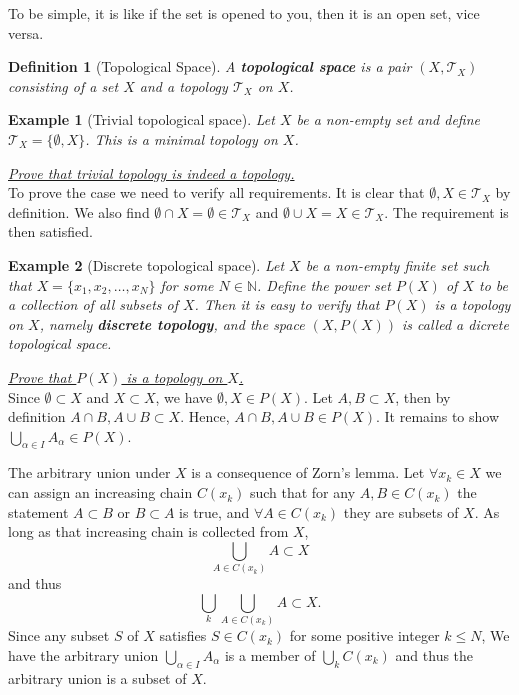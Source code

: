 \documentclass[12pt]{article}
\newtheorem{definition}{Definition}[section]
\newtheorem*{example}{Example}
\renewenvironment{proof}[1][Proof]{\begin{snugshade*} \underline{\textit{{#1}.}}\\}{\hfill \qedsymbol \end{snugshade*}}
\begin{document}
    To be simple, it is like if the set is opened to you, then it is an open set, vice versa.

    \begin{definition}[Topological Space]
        A \textbf{topological space} is a pair $(X,\mathcal{T}_X)$ consisting of a set $X$ and a topology $\mathcal{T}_X$ on $X$.
    \end{definition}

    \begin{example}[Trivial topological space]
        Let $X$ be a non-empty set and define $\mathcal{T}_X=\{\emptyset, X\}$. This is a minimal topology on $X$.
    \end{example}

    \begin{proof}[Prove that trivial topology is indeed a topology]
        To prove the case we need to verify all requirements. It is clear that $\emptyset, X\in\mathcal{T}_X$ by definition. We also find $\emptyset\cap X=\emptyset\in\mathcal{T}_X$ and $\emptyset\cup X = X\in\mathcal{T}_X$. The requirement is then satisfied.
    \end{proof}

    \begin{example}[Discrete topological space]
        Let $X$ be a non-empty finite set such that $X=\{x_1,x_2,\dots,x_N\}$ for some $N\in\mathbb{N}$. Define the power set $P(X)$ of $X$ to be a collection of all subsets of $X$. Then it is easy to verify that $P(X)$ is a topology on $X$, namely \textbf{discrete topology}, and the space $(X,P(X))$ is called a dicrete topological space.
    \end{example}

    \begin{proof}[Prove that $P(X)$ is a topology on $X$]
        Since $\emptyset\subset X$ and $X\subset X$, we have $\emptyset, X\in P(X)$. Let $A,B\subset X$, then by definition $A\cap B, A\cup B\subset X$. Hence, $A\cap B, A\cup B\in P(X)$. It remains to show $\bigcup_{\alpha\in I}A_{\alpha}\in P(X)$.

        The arbitrary union under $X$ is a consequence of Zorn's lemma. Let $\forall x_k\in X$ we can assign an increasing chain $C(x_k)$ such that for any $A,B\in C(x_k)$ the statement $A\subset B$ or $B\subset A$ is true, and $\forall A\in C(x_k)$ they are subsets of $X$. As long as that increasing chain is collected from $X$, \[\bigcup_{A\in C(x_k)}A\subset X\] and thus \[\bigcup_k \bigcup_{A\in C(x_k)}A\subset X.\] Since any subset $S$ of $X$ satisfies $S\in C(x_k)$ for some positive integer $k\leq N$, We have the arbitrary union $\bigcup_{\alpha\in I} A_{\alpha}$ is a member of $\bigcup_k C(x_k)$ and thus the arbitrary union is a subset of $X$.
    \end{proof}
\end{document}
